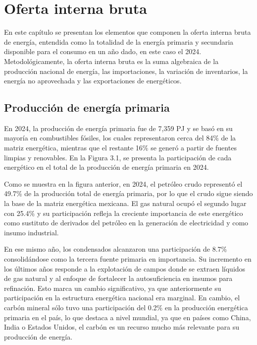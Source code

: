 \documentclass{sener2025}
\begin{document}

\section{Oferta interna bruta}

En este capítulo se presentan los elementos que componen la oferta interna bruta de energía, entendida como la totalidad de la energía primaria y secundaria disponible para el consumo en un año dado, en este caso el 2024. Metodológicamente, la oferta interna bruta es la suma algebraica de la producción nacional de energía, las importaciones, la variación de inventarios, la energía no aprovechada y las exportaciones de energéticos.


\subsection{Producción de energía primaria}

En 2024, la producción de energía primaria fue de 7,359 PJ y se basó en su mayoría en combustibles fósiles, los cuales representaron cerca del 84\% de la matriz energética, mientras que el restante 16\% se generó a partir de fuentes limpias y renovables. En la Figura 3.1, se presenta la participación de cada energético en el total de la producción de energía primaria en 2024.


Como se muestra en la figura anterior, en 2024, el petróleo crudo representó el 49.7\% de la producción total de energía primaria, por lo que el crudo sigue siendo la base de la matriz energética mexicana. El gas natural ocupó el segundo lugar con 25.4\% y su participación refleja la creciente importancia de este energético como sustituto de derivados del petróleo en la generación de electricidad y como insumo industrial.

En ese mismo año, los condensados alcanzaron una participación de 8.7\% consolidándose como la tercera fuente primaria en importancia. Su incremento en los últimos años responde a la explotación de campos donde se extraen líquidos de gas natural y al enfoque de fortalecer la autosuficiencia en insumos para refinación. Esto marca un cambio significativo, ya que anteriormente su participación en la estructura energética nacional era marginal. En cambio, el carbón mineral sólo tuvo una participación del 0.2\% en la producción energética primaria en el país, lo que destaca a nivel mundial, ya que en países como China, India o Estados Unidos, el carbón es un recurso mucho más relevante para su producción de energía.
\end{document}
